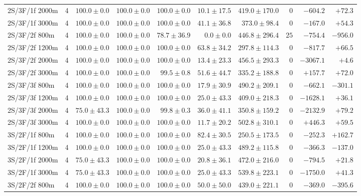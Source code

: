 \begin{tabular}{l r r r r r r r r r}
2S/3F/1f 2000m & 4 & $100.0 \pm 0.0$ & $100.0 \pm 0.0$ & $100.0 \pm 0.0$ & $10.1 \pm 17.5$ & $419.0 \pm 170.0$ & $0$ & $-604.2$ & $+72.3$ \\
2S/3F/1f 3000m & 4 & $100.0 \pm 0.0$ & $100.0 \pm 0.0$ & $100.0 \pm 0.0$ & $41.1 \pm 36.8$ & $373.0 \pm 98.4$ & $0$ & $-167.0$ & $+54.3$ \\
2S/3F/2f 800m & 4 & $100.0 \pm 0.0$ & $100.0 \pm 0.0$ & $78.7 \pm 36.9$ & $0.0 \pm 0.0$ & $446.8 \pm 296.4$ & $25$ & $-754.4$ & $-956.0$ \\
2S/3F/2f 1200m & 4 & $100.0 \pm 0.0$ & $100.0 \pm 0.0$ & $100.0 \pm 0.0$ & $63.8 \pm 34.2$ & $297.8 \pm 114.3$ & $0$ & $-817.7$ & $+66.5$ \\
2S/3F/2f 2000m & 4 & $100.0 \pm 0.0$ & $100.0 \pm 0.0$ & $100.0 \pm 0.0$ & $13.4 \pm 23.3$ & $456.5 \pm 293.3$ & $0$ & $-3067.1$ & $+4.6$ \\
2S/3F/2f 3000m & 4 & $100.0 \pm 0.0$ & $100.0 \pm 0.0$ & $99.5 \pm 0.8$ & $51.6 \pm 44.7$ & $335.2 \pm 188.8$ & $0$ & $+157.7$ & $+72.0$ \\
2S/3F/3f 800m & 4 & $100.0 \pm 0.0$ & $100.0 \pm 0.0$ & $100.0 \pm 0.0$ & $17.9 \pm 30.9$ & $490.2 \pm 209.1$ & $0$ & $-662.1$ & $-301.1$ \\
2S/3F/3f 1200m & 4 & $100.0 \pm 0.0$ & $100.0 \pm 0.0$ & $100.0 \pm 0.0$ & $25.0 \pm 43.3$ & $409.0 \pm 218.3$ & $0$ & $-1628.1$ & $+36.1$ \\
2S/3F/3f 2000m & 4 & $75.0 \pm 43.3$ & $100.0 \pm 0.0$ & $99.8 \pm 0.3$ & $36.0 \pm 41.1$ & $350.8 \pm 159.2$ & $0$ & $-2132.9$ & $+79.2$ \\
2S/3F/3f 3000m & 4 & $100.0 \pm 0.0$ & $100.0 \pm 0.0$ & $100.0 \pm 0.0$ & $11.7 \pm 20.2$ & $502.8 \pm 310.1$ & $0$ & $+446.3$ & $+59.5$ \\
3S/2F/1f 800m & 4 & $100.0 \pm 0.0$ & $100.0 \pm 0.0$ & $100.0 \pm 0.0$ & $82.4 \pm 30.5$ & $250.5 \pm 173.5$ & $0$ & $-252.3$ & $+162.7$ \\
3S/2F/1f 1200m & 4 & $100.0 \pm 0.0$ & $100.0 \pm 0.0$ & $100.0 \pm 0.0$ & $25.0 \pm 43.3$ & $489.2 \pm 115.8$ & $0$ & $-366.3$ & $-137.0$ \\
3S/2F/1f 2000m & 4 & $75.0 \pm 43.3$ & $100.0 \pm 0.0$ & $100.0 \pm 0.0$ & $20.8 \pm 36.1$ & $472.0 \pm 216.0$ & $0$ & $-794.5$ & $+21.8$ \\
3S/2F/1f 3000m & 4 & $75.0 \pm 43.3$ & $100.0 \pm 0.0$ & $100.0 \pm 0.0$ & $25.0 \pm 43.3$ & $539.8 \pm 223.1$ & $0$ & $-1750.0$ & $+41.3$ \\
3S/2F/2f 800m & 4 & $100.0 \pm 0.0$ & $100.0 \pm 0.0$ & $100.0 \pm 0.0$ & $50.0 \pm 50.0$ & $439.0 \pm 221.1$ & $0$ & $-369.0$ & $-395.6$ \\

\end{tabular}
